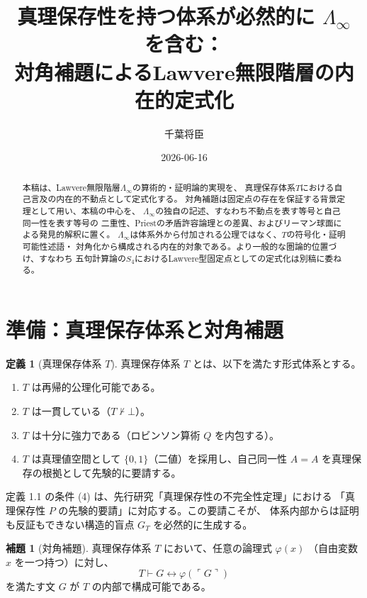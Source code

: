 \documentclass[11pt,a4paper]{ltjsarticle}
\theoremstyle{definition}
\newtheorem{definition}{定義}[section]
\newtheorem{lemma}{補題}[section]
\newcommand{\LawvereInfinity}{\Lambda_\infty}
\begin{document}
\title{真理保存性を持つ体系が必然的に $\LawvereInfinity$ を含む：\\
対角補題によるLawvere無限階層の内在的定式化}
\author{千葉将臣}
\date{2026-06-16}
\maketitle

\begin{abstract}
本稿は、Lawvere無限階層$\LawvereInfinity$の算術的・証明論的実現を、
真理保存体系$T$における自己言及の内在的不動点として定式化する。
対角補題は固定点の存在を保証する背景定理として用い、本稿の中心を、
$\LawvereInfinity$の独自の記述、すなわち不動点を表す等号と自己同一性を表す等号の
二重性、Priestの矛盾許容論理との差異、およびリーマン球面による発見的解釈に置く。
$\LawvereInfinity$は体系外から付加される公理ではなく、$T$の符号化・証明可能性述語・
対角化から構成される内在的対象である。より一般的な圏論的位置づけ、すなわち
五句計算論の$S_4$におけるLawvere型固定点としての定式化は別稿に委ねる。
\end{abstract}

\section{準備：真理保存体系と対角補題}

\begin{definition}[真理保存体系 $T$]
真理保存体系 $T$ とは、以下を満たす形式体系とする。
\begin{enumerate}[label=(\arabic*)]
    \item $T$ は再帰的公理化可能である。
    \item $T$ は一貫している（$T \nvdash \bot$）。
    \item $T$ は十分に強力である（ロビンソン算術 $Q$ を内包する）。
    \item $T$ は真理値空間として $\{0, 1\}$（二値）を採用し、自己同一性
          $A = A$ を真理保存の根拠として先験的に要請する。
\end{enumerate}
\end{definition}

定義 1.1 の条件 (4) は、先行研究「真理保存性の不完全性定理」における
「真理保存性 $P$ の先験的要請」に対応する。この要請こそが、
体系内部からは証明も反証もできない構造的盲点 $G_T$ を必然的に生成する。

\begin{lemma}[対角補題]
真理保存体系 $T$ において、任意の論理式 $\varphi(x)$
（自由変数 $x$ を一つ持つ）に対し、
$$T \vdash G \leftrightarrow \varphi(\ulcorner G \urcorner)$$
を満たす文 $G$ が $T$ の内部で構成可能である。
\end{lemma}
\end{document}
